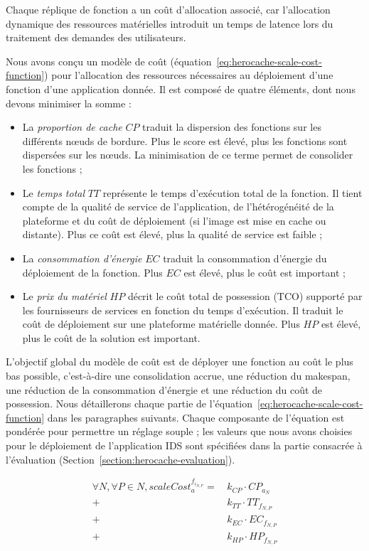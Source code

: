 Chaque réplique de fonction a un coût d'allocation associé, car l'allocation dynamique des ressources matérielles introduit un temps de latence lors du traitement des demandes des utilisateurs. 

Nous avons conçu un modèle de coût (équation~\ref{eq:herocache-scale-cost-function}) pour l'allocation des ressources nécessaires au déploiement d'une fonction d'une application donnée. Il est composé de quatre éléments, dont nous devons minimiser la somme :

\begin{itemize}
    \item La \textit{proportion de cache} $CP$ traduit la dispersion des fonctions sur les différents nœuds de bordure. Plus le score est élevé, plus les fonctions sont dispersées sur les nœuds. La minimisation de ce terme permet de consolider les fonctions ;
    \item Le \textit{temps total} $TT$ représente le temps d'exécution total de la fonction. Il tient compte de la qualité de service de l'application, de l'hétérogénéité de la plateforme et du coût de déploiement (si l'image est mise en cache ou distante). Plus ce coût est élevé, plus la qualité de service est faible ;
    \item La \textit{consommation d'énergie} $EC$ traduit la consommation d'énergie du déploiement de la fonction. Plus $EC$ est élevé, plus le coût est important ;
    \item Le \textit{prix du matériel} $HP$ décrit le coût total de possession (TCO) supporté par les fournisseurs de services en fonction du temps d'exécution. Il traduit le coût de déploiement sur une plateforme matérielle donnée. Plus $HP$ est élevé, plus le coût de la solution est important.
\end{itemize}

L'objectif global du modèle de coût est de déployer une fonction au coût le plus bas possible, c'est-à-dire une consolidation accrue, une réduction du makespan, une réduction de la consommation d'énergie et une réduction du coût de possession. Nous détaillerons chaque partie de l'équation~\ref{eq:herocache-scale-cost-function} dans les paragraphes suivants. Chaque composante de l'équation est pondérée pour permettre un réglage souple ; les valeurs que nous avons choisies pour le déploiement de l'application IDS sont spécifiées dans la partie consacrée à l'évaluation (Section~\ref{section:herocache-evaluation}).

\begin{equation}
\begin{split}
 \forall N, \forall P \in N, scaleCost^{{f}_{{i}_{N, P}}}_{a} = \,   &k_{CP} \cdot {CP}_{{a}_{N}}    \\
    + &k_{TT} \cdot {TT}_{{f}_{N, P}} \\
    + &k_{EC} \cdot {EC}_{{f}_{N, P}} \\
    + &k_{HP} \cdot {HP}_{{f}_{N, P}}
\end{split}
\label{eq:herocache-scale-cost-function}
\end{equation}

